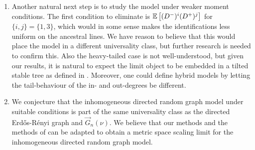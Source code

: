 \begin{enumerate}
    \item Another natural next step is to study the model under weaker moment conditions. The first condition to eliminate is ${\mathbb E}\left[(D^-)^i(D^+)^j\right]$ for $\{i,j\}=\{1,3\}$, which would in some sense makes the identifications less uniform on the ancestral lines. We have reason to believe that this would place the model in  a different universality class, but further research is needed to confirm this. Also the heavy-tailed case is not well-understood, but given our results, it is natural to expect the limit object to be embedded in a tilted stable tree as defined in \cite{conchon--kerjanStableGraphMetric2020}. Moreover, one could define hybrid models by letting the tail-behaviour of the in- and out-degrees be different. 
    \item We conjecture that the inhomogeneous directed random graph model under suitable conditions is part of the same universality class as the directed Erd\H{o}s-Rényi graph \cite{goldschmidtScalingLimitCritical2019} and $\vec{G}_n(\nu)$. We believe that our methods and the methods of \cite{goldschmidtScalingLimitCritical2019} can be adapted to obtain a metric space scaling limit for the inhomogeneous directed random graph model. 

\end{enumerate}

